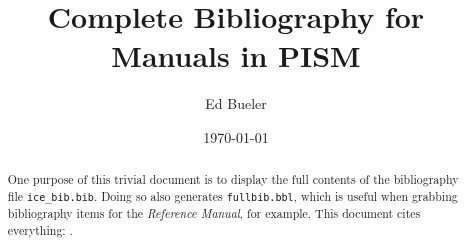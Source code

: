 \documentclass[10pt,final]{amsart}
\title{Complete Bibliography for Manuals in PISM}
\author{Ed Bueler}
\date{\today}
\begin{document}
\begin{abstract}
One purpose of this trivial document is to display the full contents of the 
bibliography file \texttt{ice\_bib.bib}.  Doing so also generates \texttt{fullbib.bbl}, 
which is useful when grabbing bibliography items for the \emph{Reference Manual}, 
for example.  This document cites everything: \cite{*}.
\end{abstract}

\maketitle

\bigskip



\end{document}
